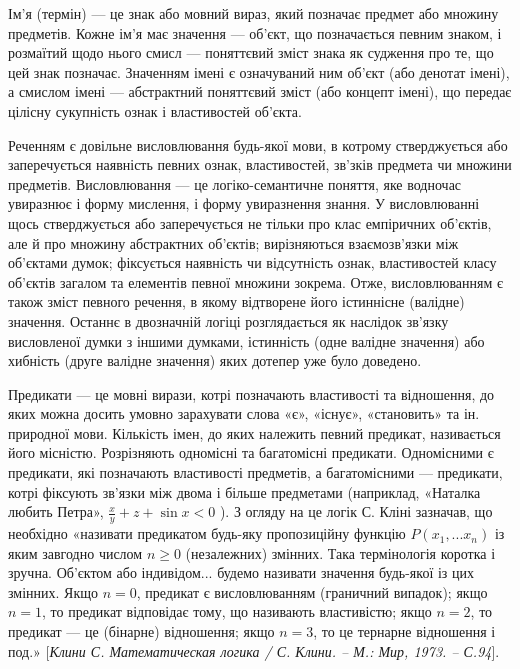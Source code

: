 Ім’я (термін) --- це знак або мовний вираз, який позначає предмет або
множину предметів. Кожне ім’я має значення --- об’єкт, що позначається певним
знаком, і розмаїтий щодо нього смисл --- поняттєвий зміст знака як судження
про те, що цей знак позначає. Значенням імені є означуваний ним об’єкт (або
денотат імені), а смислом імені --- абстрактний поняттєвий зміст (або концепт
імені), що передає цілісну сукупність ознак і властивостей об’єкта.

Реченням є довільне висловлювання будь-якої мови, в котрому
стверджується або заперечується наявність певних ознак, властивостей, зв’зків
предмета чи множини предметів. Висловлювання --- це логіко-семантичне
поняття, яке водночас увиразнює і форму мислення, і форму увиразнення
знання. У висловлюванні щось стверджується або заперечується не тільки про
клас емпіричних об’єктів, але й про множину абстрактних об’єктів;
вирізняються взаємозв’язки між об’єктами думок; фіксується наявність чи
відсутність ознак, властивостей класу об’єктів загалом та елементів певної
множини зокрема. Отже, висловлюванням є також зміст певного речення, в
якому відтворене його істиннісне (валідне) значення. Останнє в двозначній
логіці розглядається як наслідок зв’язку висловленої думки з іншими думками,
істинність (одне валідне значення) або хибність (друге валідне значення) яких
дотепер уже було доведено.

Предикати --- це мовні вирази, котрі позначають властивості та відношення,
до яких можна досить умовно зарахувати слова «є», «існує», «становить» та ін.
природної мови. Кількість імен, до яких належить певний предикат,
називається його місністю. Розрізняють одномісні та багатомісні предикати.
Одномісними є предикати, які позначають властивості предметів, а
багатомісними --- предикати, котрі фіксують зв’язки між двома і більше
предметами (наприклад, «Наталка любить Петра», $\frac{x}{y} + z + \sin x < 0$ ).
З огляду на це
логік С. Кліні зазначав, що необхідно «називати предикатом будь-яку
пропозиційну функцію $P(x_1,... x_n)$ із яким завгодно числом $n \geqslant 0$ (незалежних)
змінних. Така термінологія коротка і зручна. Об’єктом або індивідом... будемо
називати значення будь-якої із цих змінних. Якщо $n = 0$, предикат є
висловлюванням (граничний випадок); якщо $n = 1$, то предикат відповідає тому,
що називають властивістю; якщо $n = 2$, то предикат --- це (бінарне) відношення;
якщо $n = 3$, то це тернарне відношення і под.» [\textit{Клини С. Математическая
логика / С. Клини. – М.: Мир, 1973. – С.94}].


